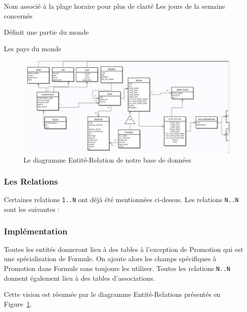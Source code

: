 \begin{itemize}
  \begin{itemize}
     Nom associé à la plage horaire pour plus de clarté
     Les jours de la semaine concernés
  \end{itemize}
   Définit une partie du monde
  \begin{itemize}
  \end{itemize}
   Les pays du monde
  \begin{itemize}
  \end{itemize}
\end{itemize}

\begin{figure}[ht]
  \centering
    \includegraphics[width=.9\textwidth]{images/Elaboration/diagramme}
    \caption{Le diagramme Entité-Relation de notre base de données}
    \label{fig:diagrammeER}
\end{figure}


\subsubsection{Les Relations}
Certaines relations \texttt{1..N} ont déjà été mentionnées ci-dessus.
Les relations \texttt{N..N} sont les suivantes :
\begin {itemize}
\end {itemize}


\subsubsection{Implémentation}
Toutes les entités donneront lieu à des tables à l'exception de Promotion qui est une spécialisation de Formule. On ajoute alors les champs spécifiques à Promotion dans Formule sans toujours les utiliser.
Toutes les relations \texttt{N..N} donnent également lieu à des tables d'associations.

Cette vision est résumée par le diagramme Entité-Relations présentés en Figure~\ref{fig:diagrammeER}.



